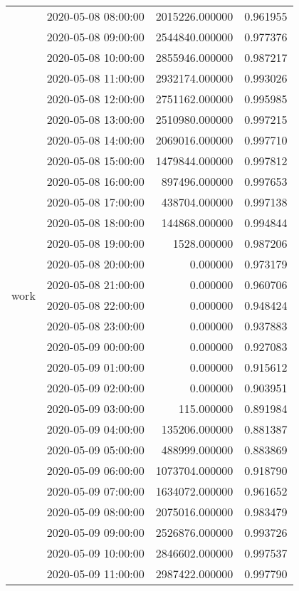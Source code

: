 \begin{tabular}{llrr}
\multirow[c]{1186}{*}{work} & 2020-05-08 08:00:00 & 2015226.000000 & 0.961955 \\
 & 2020-05-08 09:00:00 & 2544840.000000 & 0.977376 \\
 & 2020-05-08 10:00:00 & 2855946.000000 & 0.987217 \\
 & 2020-05-08 11:00:00 & 2932174.000000 & 0.993026 \\
 & 2020-05-08 12:00:00 & 2751162.000000 & 0.995985 \\
 & 2020-05-08 13:00:00 & 2510980.000000 & 0.997215 \\
 & 2020-05-08 14:00:00 & 2069016.000000 & 0.997710 \\
 & 2020-05-08 15:00:00 & 1479844.000000 & 0.997812 \\
 & 2020-05-08 16:00:00 & 897496.000000 & 0.997653 \\
 & 2020-05-08 17:00:00 & 438704.000000 & 0.997138 \\
 & 2020-05-08 18:00:00 & 144868.000000 & 0.994844 \\
 & 2020-05-08 19:00:00 & 1528.000000 & 0.987206 \\
 & 2020-05-08 20:00:00 & 0.000000 & 0.973179 \\
 & 2020-05-08 21:00:00 & 0.000000 & 0.960706 \\
 & 2020-05-08 22:00:00 & 0.000000 & 0.948424 \\
 & 2020-05-08 23:00:00 & 0.000000 & 0.937883 \\
 & 2020-05-09 00:00:00 & 0.000000 & 0.927083 \\
 & 2020-05-09 01:00:00 & 0.000000 & 0.915612 \\
 & 2020-05-09 02:00:00 & 0.000000 & 0.903951 \\
 & 2020-05-09 03:00:00 & 115.000000 & 0.891984 \\
 & 2020-05-09 04:00:00 & 135206.000000 & 0.881387 \\
 & 2020-05-09 05:00:00 & 488999.000000 & 0.883869 \\
 & 2020-05-09 06:00:00 & 1073704.000000 & 0.918790 \\
 & 2020-05-09 07:00:00 & 1634072.000000 & 0.961652 \\
 & 2020-05-09 08:00:00 & 2075016.000000 & 0.983479 \\
 & 2020-05-09 09:00:00 & 2526876.000000 & 0.993726 \\
 & 2020-05-09 10:00:00 & 2846602.000000 & 0.997537 \\
 & 2020-05-09 11:00:00 & 2987422.000000 & 0.997790 \\

\end{tabular}
